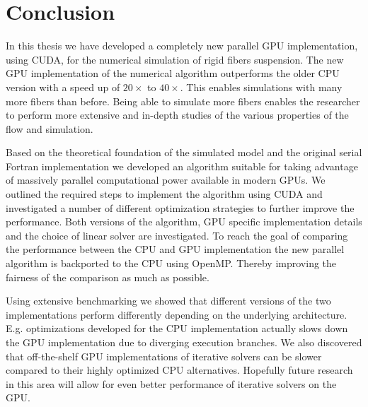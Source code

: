 \chapter{Conclusion}

In this thesis we have developed a completely new parallel GPU implementation, using CUDA, for the numerical simulation of rigid fibers suspension. The new GPU implementation of the numerical algorithm outperforms the older CPU version with a speed up of $20×$ to $40×$. This enables simulations with many more fibers than before. Being able to simulate more fibers enables the researcher to perform more extensive and in-depth studies of the various properties of the flow and simulation.

Based on the theoretical foundation of the simulated model and the original serial Fortran implementation we developed an algorithm suitable for taking advantage of massively parallel computational power available in modern GPUs. We outlined the required steps to implement the algorithm using CUDA and investigated a number of different optimization strategies to further improve the performance. Both versions of the algorithm, GPU specific implementation details and the choice of linear solver are investigated. To reach the goal of comparing the performance between the CPU and GPU implementation the new parallel algorithm is backported to the CPU using OpenMP. Thereby improving the fairness of the comparison as much as possible.

Using extensive benchmarking we showed that different versions of the two implementations perform differently depending on the underlying architecture. E.g. optimizations developed for the CPU implementation actually slows down the GPU implementation due to diverging execution branches. We also discovered that off-the-shelf GPU implementations of iterative solvers can be slower compared to their highly optimized CPU alternatives. Hopefully future research in this area will allow for even better performance of iterative solvers on the GPU.

